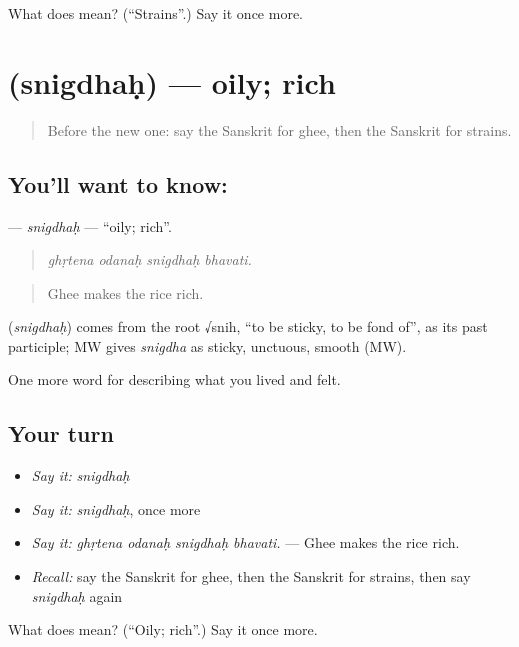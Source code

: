 \begin{tcolorbox}[breakable,colback=teal!4,colframe=teal!35!black,title={Before you move on}]
What does  mean? (\textquotedblleft{}Strains\textquotedblright{}.) Say it once more.
\end{tcolorbox}
\section[\texorpdfstring{\sk{स्निग्धः} (snigdhaḥ)}{स्निग्धः (snigdhaḥ)}]{ (snigdhaḥ) — oily; rich}

\label{lesson:SA-C513-snigdhah}



\begin{quote}
Before the new one: say the Sanskrit for ghee, then the Sanskrit for strains.
\end{quote}

\subsection*{You'll want to know: }
\textbf{} — \emph{snigdhaḥ} — \textquotedblleft{}oily; rich\textquotedblright{}.

\begin{quote}
   
\end{quote}

\begin{quote}
\emph{ghṛtena odanaḥ snigdhaḥ bhavati.}
\end{quote}

\begin{quote}
Ghee makes the rice rich.
\end{quote}

\begin{cousinweb}
\textbf{} (\emph{snigdhaḥ}) comes from the root √snih, \textquotedblleft{}to be sticky, to be fond of\textquotedblright{}, as its past participle; MW gives \emph{snigdha} as sticky, unctuous, smooth (MW).
\end{cousinweb}

\begin{grammarlens}[title={What you've built}]
One more word for describing what you lived and felt.
\end{grammarlens}

\subsection*{Your turn}
\begin{itemize}
\raggedright
  \item \emph{Say it:} \emph{snigdhaḥ}
  \item \emph{Say it:} \emph{snigdhaḥ}, once more
  \item \emph{Say it:} \emph{ghṛtena odanaḥ snigdhaḥ bhavati.} — Ghee makes the rice rich.
  \item \emph{Recall:} say the Sanskrit for ghee, then the Sanskrit for strains, then say \emph{snigdhaḥ} again
\end{itemize}

\begin{tcolorbox}[breakable,colback=teal!4,colframe=teal!35!black,title={Before you move on}]
What does  mean? (\textquotedblleft{}Oily; rich\textquotedblright{}.) Say it once more.
\end{tcolorbox}

